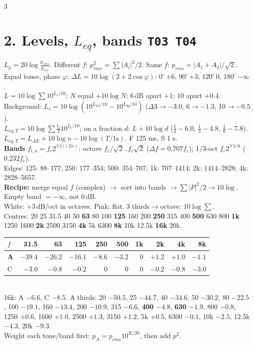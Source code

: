 \documentclass[10pt]{article}
\newcommand{\T}[1]{\textcolor{sec}{\texttt{#1}}}
\newcommand{\trap}[1]{\textcolor{trap}{#1}}
\begin{document}
\begin{multicols*}{3}
\section{2. Levels, $L_{eq}$, bands \quad\T{T03 T04}}
$L_p=20\log\frac{p_{rms}}{p_{ref}}$. Different $f$: $p^2_{rms}=\sum|A_i|^2/2$. Same $f$: $p_{rms}=|A_1+A_2|/\sqrt2$. Equal tones, phase $\varphi$: $\Delta L=10\log(2+2\cos\varphi)$: $0^\circ\,{+6}$, $90^\circ\,{+3}$, $120^\circ\,0$, $180^\circ\,{-\infty}$.\\
$L=10\log\sum10^{L_i/10}$; $N$ equal $+10\log N$; 6\,dB apart $+1$; 10 apart $+0.4$.\\
Background: $L_s=10\log(10^{L_{tot}/10}-10^{L_{bg}/10})$ ($\Delta$3$\to-3.0$, 6$\to-1.3$, 10$\to-0.5$).\\
$\boxed{L_{eq,T}=10\log\sum\frac{t_i}{T}10^{L_i/10}}$; on a fraction $d$: $L+10\log d$ ($\tfrac14\!-\!6.0$, $\tfrac13\!-\!4.8$, $\tfrac16\!-\!7.8$).\\
$L_{eq,T}=L_{AE}+10\log n-10\log(T/1\mathrm{s})$. F 125 ms, S 1 s.\\
\textbf{Bands} $f_{l,u}=f_c2^{\mp1/(2n)}$: octave $f_c/\sqrt2..f_c\sqrt2$ ($\Delta f=0.707f_c$); 1/3-oct $f_c2^{\mp1/6}$ ($0.232f_c$).\\
Edges: 125: 88--177; 250: 177--354; 500: 354--707; 1k: 707--1414; 2k: 1414--2828; 4k: 2828--5657.\\
\textbf{Recipe:} merge equal $f$ (complex) $\to$ sort into bands $\to\sum|P|^2/2\to10\log$. \trap{Empty band $=-\infty$, not 0\,dB.}\\
White: +3\,dB/oct in octaves. Pink: flat. 3 thirds$\to$octave: $10\log\sum$.\\
Centres: 20 25 31.5 40 50 \textbf{63} 80 100 \textbf{125} 160 200 \textbf{250} 315 400 \textbf{500} 630 800 \textbf{1k} 1250 1600 \textbf{2k} 2500 3150 \textbf{4k} 5k 6300 \textbf{8k} 10k 12.5k \textbf{16k} 20k.

{\scriptsize
\setlength{\tabcolsep}{2pt}\begin{tabular}{@{}l*{9}{r}@{}}
\toprule
$f$ & 31.5 & 63 & 125 & 250 & 500 & 1k & 2k & 4k & 8k\\\midrule
\textbf{A} & $-39.4$ & $-26.2$ & $-16.1$ & $-8.6$ & $-3.2$ & 0 & $+1.2$ & $+1.0$ & $-1.1$\\
C & $-3.0$ & $-0.8$ & $-0.2$ & 0 & 0 & 0 & $-0.2$ & $-0.8$ & $-3.0$\\\bottomrule
\end{tabular}}\\
{\scriptsize 16k: A $-6.6$, C $-8.5$.}
{\scriptsize A thirds: 20 $-50.5$, 25 $-44.7$, 40 $-34.6$, 50 $-30.2$, 80 $-22.5$, 100 $-19.1$, 160 $-13.4$, 200 $-10.9$, 315 $-6.6$, \textbf{400 $-4.8$}, \textbf{630 $-1.9$}, 800 $-0.8$, 1250 $+0.6$, 1600 $+1.0$, 2500 $+1.3$, 3150 $+1.2$, 5k $+0.5$, 6300 $-0.1$, 10k $-2.5$, 12.5k $-4.3$, 20k $-9.3$.}\\
Weight each tone/band first: $p_A=p_{rms}10^{K/20}$, then add $p^2$.


\end{multicols*}
\end{document}
